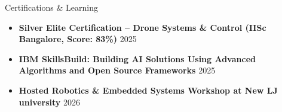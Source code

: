 \documentclass[10pta]{resume} %
\begin{document}
\begin{rSection}{Certifications \& Learning} 
\begin{itemize}
    \item \textbf{Silver Elite Certification – Drone Systems \& Control (IISc Bangalore, Score: 83\%) } \href{https://archive.nptel.ac.in/noc/Ecertificate/?q=NPTEL25AE30S115060018110775085}{\faFile}
\hfill 2025
    \item \textbf{IBM SkillsBuild: Building AI Solutions Using Advanced Algorithms and Open Source Frameworks } \href{https://www.credly.com/badges/97f94498-22fa-4daa-8b79-af7fa23581db/}{\faFile} \hfill 2025
\item \textbf{Hosted Robotics \& Embedded Systems Workshop at New LJ university} \href{https://rikinparekh.in/resume/lj_host_cert.pdf}{\faFile} \hfill 2026
\end{itemize}


\end{rSection}
\end{document}
